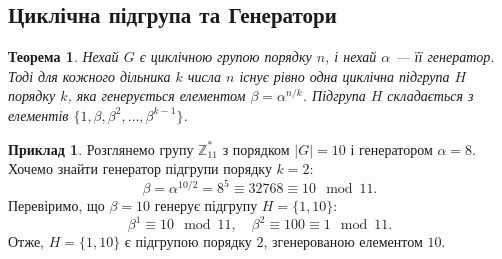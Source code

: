 \documentclass[12pt]{report}
\theoremstyle{definition}
\newtheorem{example}{Приклад}[chapter]
\theoremstyle{plain}
\newtheorem{theorem}{Теорема}[chapter]
\begin{document}
\subsection{Циклічна підгрупа та Генератори}

\begin{theorem}
Нехай \( G \) є циклічною групою порядку \( n \), і нехай \( \alpha \) — її генератор. Тоді для кожного дільника \( k \) числа \( n \) існує рівно одна циклічна підгрупа \( H \) порядку \( k \), яка генерується елементом \( \beta = \alpha^{n/k} \). Підгрупа \( H \) складається з елементів \( \{1, \beta, \beta^2, \ldots, \beta^{k-1}\} \).
\end{theorem}

\begin{example}
Розглянемо групу \( \mathbb{Z}^*_{11} \) з порядком \( |G| = 10 \) і генератором \( \alpha = 8 \). Хочемо знайти генератор підгрупи порядку \( k = 2 \):
\[
\beta = \alpha^{10/2} = 8^5 \equiv 32768 \equiv 10 \mod 11.
\]
Перевіримо, що \( \beta = 10 \) генерує підгрупу \( H = \{1, 10\} \):
\[
\beta^1 \equiv 10 \mod 11, \quad \beta^2 \equiv 100 \equiv 1 \mod 11.
\]
Отже, \( H = \{1, 10\} \) є підгрупою порядку \( 2 \), згенерованою елементом \( 10 \).
\end{example}
\end{document}
